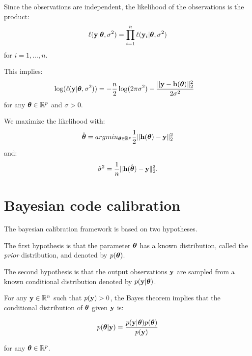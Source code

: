 \documentclass{beamer}
\begin{document}

\begin{frame}
Since the observations are independent, the likelihood of the observations is 
the product:
$$
\ell({\bf y}|\boldsymbol{\theta},\sigma^2) = 
\prod_{i=1}^n \ell({\bf y}_i|\boldsymbol{\theta},\sigma^2)
$$
for $i=1,...,n$. 

This implies:
\begin{align*}
\log(\ell({\bf y}|\boldsymbol{\theta},\sigma^2)) 
&= -\frac{n}{2} \log(2\pi \sigma^2)
-\frac{\|{\bf y} - {\bf h}(\boldsymbol{\theta})\|_2^2}{2 \sigma^2}
\end{align*}
for any $\boldsymbol{\theta}\in\mathbb{R}^p$ and $\sigma>0$. 

We maximize the likelihood with:
\begin{align*}
\hat{\boldsymbol{\theta}}
= arg min_{\boldsymbol{\theta}\in\mathbb{R}^p} \frac{1}{2} \| {\bf h}(\boldsymbol{\theta}) - {\bf y}\|_2^2
\end{align*}
and:
\begin{align*}
\hat{\sigma}^2
= \frac{1}{n} \| {\bf h}(\hat{\boldsymbol{\theta}}) - {\bf y}\|_2^2.
\end{align*}

\end{frame}

\section{Bayesian code calibration}

\begin{frame}

The bayesian calibration framework is based on two hypotheses.

The first hypothesis is that the parameter $\boldsymbol{\theta}$ has a
known distribution, called the \emph{prior} distribution, and denoted by
$p(\boldsymbol{\theta})$.

The second hypothesis is that the output observations
${\bf y}$ are sampled from a known
conditional distribution denoted by $p({\bf y} | \boldsymbol{\theta})$.

For any ${\bf y}\in\mathbb{R}^{n}$ such that $p({\bf y})>0$,
the Bayes theorem implies that the conditional distribution of
$\boldsymbol{\theta}$ given ${\bf y}$ is:

$$
p(\boldsymbol{\theta} | {\bf y}) = \frac{p({\bf y} | \boldsymbol{\theta}) p(\boldsymbol{\theta})}{p({\bf y})}
$$

for any $\boldsymbol{\theta}\in\mathbb{R}^p$.

\end{frame}
\end{document}
